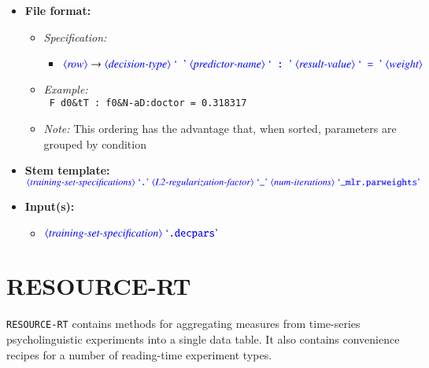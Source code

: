 \documentclass[12pt]{report}
\def\magenta{\color{magenta}}
\begin{document}
\begin{itemize}
      \item \textbf{File format:}
      \begin{itemize}
            \item \textit{Specification:}
            \begin{itemize}
                  \item {\small $\dtype{row} \rightarrow \dtype{decision-type} \ \dcode{\ } \ \dtype{predictor-name} \ \dcode{\ :\ } \ \dtype{result-value} \ \dcode{\ =\ } \ \dtype{weight}$}
            \end{itemize}
            \item \textit{Example:}\\
            {\magenta\tt
            F d0\&tT : f0\&N-aD:doctor = 0.318317
            }
            \item \textit{Note:} This ordering has the advantage that, when sorted, parameters are grouped by condition
      \end{itemize}
      \item \textbf{Stem template:}\\
      $\dtype{training-set-specifications} \ \dcode{.} \ \dtype{L2-regularization-factor} \ \dcode{\_} \ \dtype{num-iterations} \ \dcode{\_mlr.parweights}$
      \item \textbf{Input(s):}
      \begin{itemize}
            \item $\dtype{training-set-specification} \ \dcode{.decpars}$
      \end{itemize}
\end{itemize}







\chapter{RESOURCE-RT}

{\tt RESOURCE-RT} contains methods for aggregating measures from time-series psycholinguistic experiments into a single data table.
It also contains convenience recipes for a number of reading-time experiment types.
\end{document}
